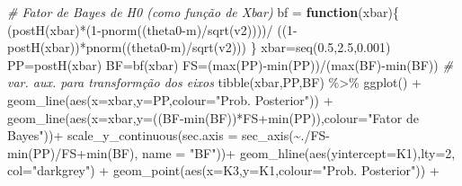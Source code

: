 \documentclass[
]{book}
\newenvironment{Shaded}{\begin{snugshade}}{\end{snugshade}}
\newcommand{\AttributeTok}[1]{\textcolor[rgb]{0.77,0.63,0.00}{#1}}
\newcommand{\CommentTok}[1]{\textcolor[rgb]{0.56,0.35,0.01}{\textit{#1}}}
\newcommand{\ControlFlowTok}[1]{\textcolor[rgb]{0.13,0.29,0.53}{\textbf{#1}}}
\newcommand{\DecValTok}[1]{\textcolor[rgb]{0.00,0.00,0.81}{#1}}
\newcommand{\FloatTok}[1]{\textcolor[rgb]{0.00,0.00,0.81}{#1}}
\newcommand{\FunctionTok}[1]{\textcolor[rgb]{0.00,0.00,0.00}{#1}}
\newcommand{\NormalTok}[1]{#1}
\newcommand{\OtherTok}[1]{\textcolor[rgb]{0.56,0.35,0.01}{#1}}
\newcommand{\SpecialCharTok}[1]{\textcolor[rgb]{0.00,0.00,0.00}{#1}}
\newcommand{\StringTok}[1]{\textcolor[rgb]{0.31,0.60,0.02}{#1}}
\begin{document}
\begin{Shaded}
\begin{Highlighting}[]
\CommentTok{\# Fator de Bayes de H0 (como função de Xbar)}
\NormalTok{bf }\OtherTok{=} \ControlFlowTok{function}\NormalTok{(xbar)\{}
\NormalTok{  (}\FunctionTok{postH}\NormalTok{(xbar)}\SpecialCharTok{*}\NormalTok{(}\DecValTok{1}\SpecialCharTok{{-}}\FunctionTok{pnorm}\NormalTok{((theta0}\SpecialCharTok{{-}}\NormalTok{m)}\SpecialCharTok{/}\FunctionTok{sqrt}\NormalTok{(v2))))}\SpecialCharTok{/}\NormalTok{ ((}\DecValTok{1}\SpecialCharTok{{-}}\FunctionTok{postH}\NormalTok{(xbar))}\SpecialCharTok{*}\FunctionTok{pnorm}\NormalTok{((theta0}\SpecialCharTok{{-}}\NormalTok{m)}\SpecialCharTok{/}\FunctionTok{sqrt}\NormalTok{(v2))) \}}
\NormalTok{xbar}\OtherTok{=}\FunctionTok{seq}\NormalTok{(}\FloatTok{0.5}\NormalTok{,}\FloatTok{2.5}\NormalTok{,}\FloatTok{0.001}\NormalTok{)}
\NormalTok{PP}\OtherTok{=}\FunctionTok{postH}\NormalTok{(xbar)}
\NormalTok{BF}\OtherTok{=}\FunctionTok{bf}\NormalTok{(xbar)}
\NormalTok{FS}\OtherTok{=}\NormalTok{(}\FunctionTok{max}\NormalTok{(PP)}\SpecialCharTok{{-}}\FunctionTok{min}\NormalTok{(PP))}\SpecialCharTok{/}\NormalTok{(}\FunctionTok{max}\NormalTok{(BF)}\SpecialCharTok{{-}}\FunctionTok{min}\NormalTok{(BF)) }\CommentTok{\# var. aux. para transformção dos eixos}
\FunctionTok{tibble}\NormalTok{(xbar,PP,BF) }\SpecialCharTok{\%\textgreater{}\%}
  \FunctionTok{ggplot}\NormalTok{() }\SpecialCharTok{+}
    \FunctionTok{geom\_line}\NormalTok{(}\FunctionTok{aes}\NormalTok{(}\AttributeTok{x=}\NormalTok{xbar,}\AttributeTok{y=}\NormalTok{PP,}\AttributeTok{colour=}\StringTok{"Prob. Posterior"}\NormalTok{)) }\SpecialCharTok{+}
    \FunctionTok{geom\_line}\NormalTok{(}\FunctionTok{aes}\NormalTok{(}\AttributeTok{x=}\NormalTok{xbar,}\AttributeTok{y=}\NormalTok{((BF}\SpecialCharTok{{-}}\FunctionTok{min}\NormalTok{(BF))}\SpecialCharTok{*}\NormalTok{FS}\SpecialCharTok{+}\FunctionTok{min}\NormalTok{(PP)),}\AttributeTok{colour=}\StringTok{"Fator de Bayes"}\NormalTok{))}\SpecialCharTok{+}
    \FunctionTok{scale\_y\_continuous}\NormalTok{(}\AttributeTok{sec.axis =} \FunctionTok{sec\_axis}\NormalTok{(}\SpecialCharTok{\textasciitilde{}}\NormalTok{.}\SpecialCharTok{/}\NormalTok{FS}\SpecialCharTok{{-}}\FunctionTok{min}\NormalTok{(PP)}\SpecialCharTok{/}\NormalTok{FS}\SpecialCharTok{+}\FunctionTok{min}\NormalTok{(BF), }\AttributeTok{name =} \StringTok{"BF"}\NormalTok{))}\SpecialCharTok{+}
    \FunctionTok{geom\_hline}\NormalTok{(}\FunctionTok{aes}\NormalTok{(}\AttributeTok{yintercept=}\NormalTok{K1),}\AttributeTok{lty=}\DecValTok{2}\NormalTok{, }\AttributeTok{col=}\StringTok{"darkgrey"}\NormalTok{) }\SpecialCharTok{+}
    \FunctionTok{geom\_point}\NormalTok{(}\FunctionTok{aes}\NormalTok{(}\AttributeTok{x=}\NormalTok{K3,}\AttributeTok{y=}\NormalTok{K1,}\AttributeTok{colour=}\StringTok{"Prob. Posterior"}\NormalTok{)) }\SpecialCharTok{+}

\end{Highlighting}
\end{Shaded}
\end{document}
